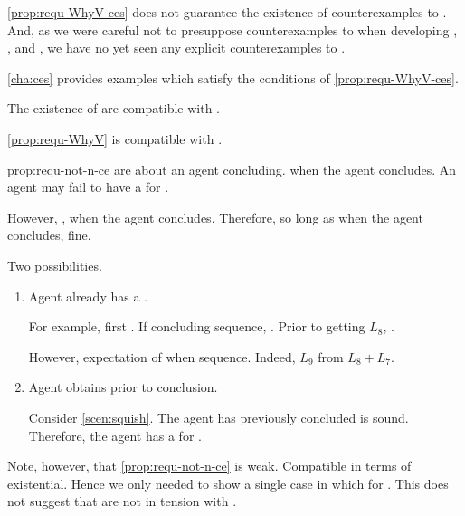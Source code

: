\begin{note}
  \autoref{prop:requ-WhyV-ces} does not guarantee the existence of counterexamples to \issueConstraint{}.
  And, as we were careful not to presuppose counterexamples to \issueConstraint{} when developing , , and , we have no yet seen any explicit counterexamples to \issueConstraint{}.

  \autoref{cha:ces} provides examples which satisfy the conditions of \autoref{prop:requ-WhyV-ces}.
\end{note}

\begin{note}
  The existence of  are compatible with \issueConstraint{}.

  \begin{observation}%
    \label{prop:requ-not-n-ce}%
    \autoref{prop:requ-WhyV} is compatible with \issueConstraint{}.
  \end{observation}

  \begin{motivation}{prop:requ-not-n-ce}
     are about an agent concluding.
    \fc{} when the agent concludes.
    An agent may fail to have a \wit{} for \fc{}.

    However, \issueConstraint{}, \wit{} when the agent concludes.
    Therefore, so long as \wit{} when the agent concludes, fine.

    Two possibilities.
    \begin{enumerate}
    \item
      Agent already has a \wit{}.

      For example, first .
      If concluding sequence, \fc{}.
      Prior to getting \(L_{8}\), \fc{}.

      However, expectation of \wit{} when sequence.
      Indeed, \(L_{9}\) from \(L_{8} + L_{7}\).
    \item
      Agent obtains \wit{} prior to conclusion.

      Consider \autoref{scen:squish}.
      The agent has previously concluded \sqE{} is sound.
      Therefore, the agent has a \wit{} for \ros{}.
    \end{enumerate}
  \end{motivation}

  Note, however, that \autoref{prop:requ-not-n-ce} is weak.
  Compatible in terms of existential.
  Hence we only needed to show a single case in which \wit{} for \requ{}.
  This does not suggest that  are not in tension with \issueConstraint{}.
\end{note}

